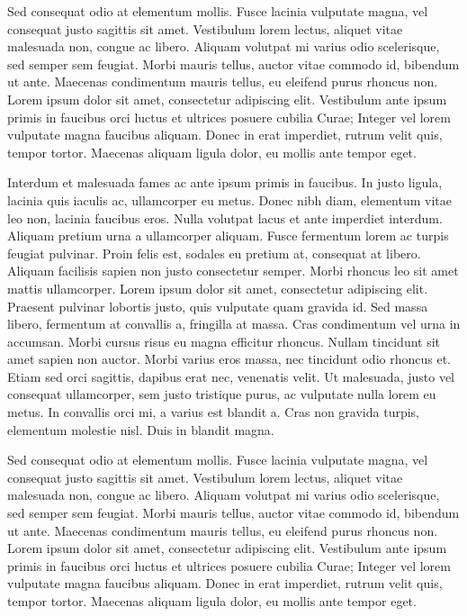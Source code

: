 Sed consequat odio at elementum mollis. Fusce lacinia vulputate magna, vel 
consequat justo sagittis sit amet. Vestibulum lorem lectus, aliquet vitae 
malesuada non, congue ac libero. Aliquam volutpat mi varius odio scelerisque, 
sed semper sem feugiat. Morbi mauris tellus, auctor vitae commodo id, bibendum 
ut ante. Maecenas condimentum mauris tellus, eu eleifend purus rhoncus non. 
Lorem ipsum dolor sit amet, consectetur adipiscing elit. Vestibulum ante ipsum 
primis in faucibus orci luctus et ultrices posuere cubilia Curae; Integer vel 
lorem vulputate magna faucibus aliquam. Donec in erat imperdiet, rutrum velit 
quis, tempor tortor. Maecenas aliquam ligula dolor, eu mollis ante tempor eget.

Interdum et malesuada fames ac ante ipsum primis in faucibus. In justo ligula, 
lacinia quis iaculis ac, ullamcorper eu metus. Donec nibh diam, elementum vitae 
leo non, lacinia faucibus eros. Nulla volutpat lacus et ante imperdiet 
interdum. Aliquam pretium urna a ullamcorper aliquam. Fusce fermentum lorem ac 
turpis feugiat pulvinar. Proin felis est, sodales eu pretium at, consequat at 
libero. Aliquam facilisis sapien non justo consectetur semper. Morbi rhoncus 
leo sit amet mattis ullamcorper.
Lorem ipsum dolor sit amet, consectetur adipiscing elit. Praesent pulvinar 
lobortis justo, quis vulputate quam gravida id. Sed massa libero, fermentum at 
convallis a, fringilla at massa. Cras condimentum vel urna in accumsan. Morbi 
cursus risus eu magna efficitur rhoncus. Nullam tincidunt sit amet sapien non 
auctor. Morbi varius eros massa, nec tincidunt odio rhoncus et. Etiam sed orci 
sagittis, dapibus erat nec, venenatis velit. Ut malesuada, justo vel consequat 
ullamcorper, sem justo tristique purus, ac vulputate nulla lorem eu metus. In 
convallis orci mi, a varius est blandit a. Cras non gravida turpis, elementum 
molestie nisl. Duis in blandit magna.

Sed consequat odio at elementum mollis. Fusce lacinia vulputate magna, vel 
consequat justo sagittis sit amet. Vestibulum lorem lectus, aliquet vitae 
malesuada non, congue ac libero. Aliquam volutpat mi varius odio scelerisque, 
sed semper sem feugiat. Morbi mauris tellus, auctor vitae commodo id, bibendum 
ut ante. Maecenas condimentum mauris tellus, eu eleifend purus rhoncus non. 
Lorem ipsum dolor sit amet, consectetur adipiscing elit. Vestibulum ante ipsum 
primis in faucibus orci luctus et ultrices posuere cubilia Curae; Integer vel 
lorem vulputate magna faucibus aliquam. Donec in erat imperdiet, rutrum velit 
quis, tempor tortor. Maecenas aliquam ligula dolor, eu mollis ante tempor eget.

